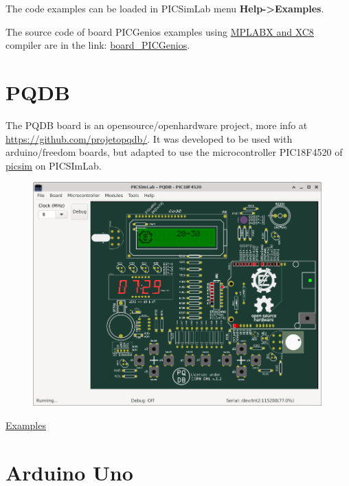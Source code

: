 The code examples can be loaded in PICSimLab menu \textbf{Help->Examples}.

The source code of board PICGenios examples using 
\href{http://www.microchip.com/mplabx}{MPLABX and XC8} compiler are in the link: 
\href{https://lcgamboa.github.io/picsimlab_examples/examples/examples_index.html\#board_PICGenios}{board\_PICGenios}.




\section{PQDB}

The PQDB board is an opensource/openhardware project, more info at \href{https://github.com/projetopqdb/}{https://github.com/projetopqdb/}.
It was developed to be used with arduino/freedom boards, but adapted to use the microcontroller PIC18F4520 of 
\href{https://github.com/lcgamboa/picsim}{picsim} on PICSImLab.

\begin{figure}[H]
\center
\includegraphics[width=0.99\textwidth]{img/board_PQDB.png} 
\end{figure} 

\href{https://lcgamboa.github.io/picsimlab_examples/examples/examples_index.html\#board_PQDB}{Examples}


\section{Arduino Uno}

